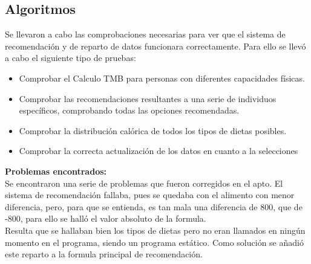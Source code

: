 \subsection{Algoritmos}
Se llevaron a cabo las comprobaciones necesarias para ver que el sistema de recomendación y de reparto de datos funcionara correctamente. Para ello se llevó a cabo el siguiente tipo de pruebas:
\begin{itemize}
\item Comprobar el Calculo TMB para personas con diferentes capacidades físicas.
\item Comprobar las recomendaciones resultantes a una serie de individuos específicos, comprobando todas las opciones recomendadas.
\item Comprobar la distribución calórica de todos los tipos de dietas posibles.
\item Comprobar la correcta actualización de los datos en cuanto a la selecciones
\end{itemize}
\textbf{Problemas encontrados:}\\
Se encontraron una serie de problemas que fueron corregidos en el apto. El sistema de recomendación fallaba, pues se quedaba con el alimento con menor diferencia, pero, para que se entienda, es tan mala una diferencia de 800, que de -800, para ello se halló el valor absoluto de la formula.\\
Resulta que se hallaban bien los tipos de dietas pero no eran llamados en ningún momento en el programa, siendo un programa estático. Como solución se añadió este reparto a la formula principal de recomendación.